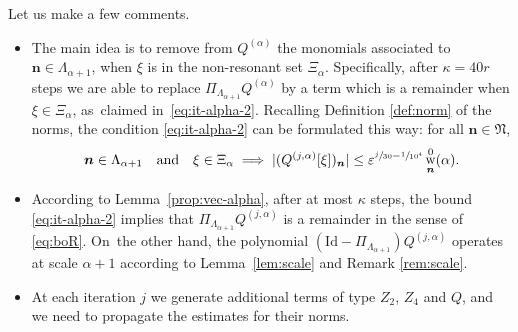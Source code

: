 \documentclass[JEP,XML,SOM,Unicode,published]{cedram}
\DeclareMathOperator{\rw}{w}
\theoremstyle{plain}
\theoremstyle{definition}
\newcommand{\nb}{{\boldsymbol n}}
\newcommand{\Nb}{{\boldsymbol{\mathfrak{N}}}}
\newcommand{\1}{\mathbf{1}}
\let\epsilon\varepsilon
\begin{document}
Let us make a few comments.

\begin{itemize}
\item The main idea is to remove from $Q^{(\alpha)}$ the monomials associated to $\nb\in\Lambda_{\alpha+1}$, when $\xi$ is in the non-resonant set $\Xi_{\alpha}$. Specifically, after $\kappa=40r$ steps we are able to replace $\Pi_{\Lambda_{\alpha+1}}Q^{(\alpha)}$ by a term which is a remainder when $\xi\in\Xi_{\alpha}$, as~claimed in~\eqref{eq:it-alpha-2}. Recalling Definition \ref{def:norm} of the norms, the condition \eqref{eq:it-alpha-2} can be formulated this way: for all $\nb\in\Nb$,
\begin{equation}
\label{eq:it-alpha-2bis}
\nb\in\Lambda_{\alpha+1}\quad \text{and}
\quad \xi\in \Xi_{\alpha}
\implies |(Q^{(j,\alpha)}[\xi])_{\nb}| \leq
\epsilon^{\sfrac{j}{30}-\sfrac{1}{10^{4}}}\rw_{\nb}^{0}(\alpha).
\end{equation}
\item According to Lemma~\ref{prop:vec-alpha}, after at most $\kappa$ steps, the bound \eqref{eq:it-alpha-2} implies that $\Pi_{\Lambda_{\alpha+1}}Q^{(j,\alpha)}$ is a remainder in the sense of \eqref{eq:boR}. On~the other hand, the polynomial $(\mathrm{Id}-\Pi_{\Lambda_{\alpha+1}})Q^{(j,\alpha)}$ operates at scale $\alpha+1$ according to Lemma~\ref{lem:scale} and Remark \ref{rem:scale}.
\item At each iteration $j$ we generate additional terms of type $Z_{2}$, $Z_{4}$ and $Q$, and we need to propagate the estimates for their norms.
\end{itemize}
\end{document}
